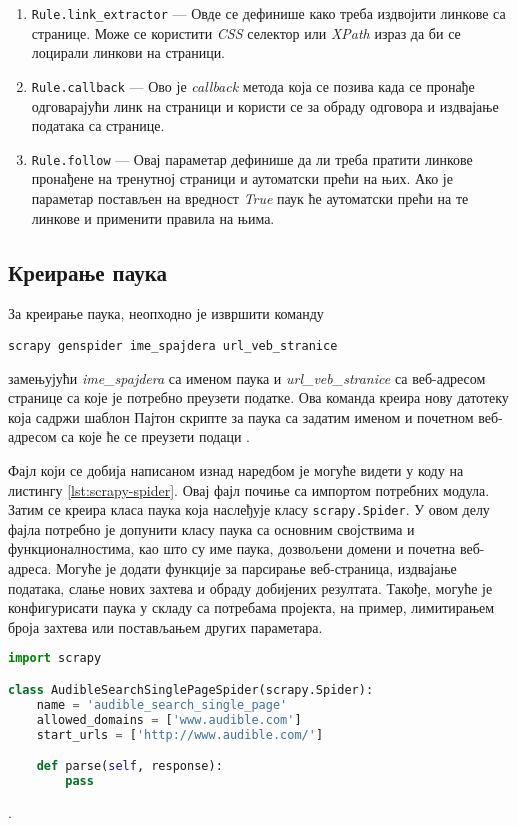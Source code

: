 \documentclass[12pt,oneside]{memoir}
\begin{document}
\begin{enumerate}
    \item \texttt{Rule.link\_extractor} --- Овде се дефинише како треба издвојити линкове са странице. Може се користити \textit{CSS} селектор или \textit{XPath} израз да би се лоцирали линкови на страници.
    \item \texttt{Rule.callback} --- Ово је \textit{callback} метода која се позива када се пронађе одговарајући линк на страници и користи се за обраду одговора и издвајање података са странице.
    \item \texttt{Rule.follow} --- Овај параметар дефинише да ли треба пратити линкове пронађене на тренутној страници и аутоматски прећи на њих. Ако је параметар постављен на вредност \textit{True} паук ће аутоматски прећи на те линкове и применити правила на њима.
\end{enumerate}

\subsection{Креирање паука}
За креирање паука, неопходно је извршити команду
\begin{verbatim}
scrapy genspider ime_spajdera url_veb_stranice
\end{verbatim}
замењујући \textit{ime\_spajdera} са именом паука и \textit{url\_veb\_stranice} са веб-адресом странице са које је потребно преузети податке. Ова команда креира нову датотеку која садржи шаблон Пајтон скрипте за паука са задатим именом и почетном веб-адресом са које ће се преузети подаци \cite{WebScrapingWithPython}.

Фајл који се добија написаном изнад наредбом је могуће видети у коду на листингу \ref{lst:scrapy-spider}. Овај фајл почиње са импортом потребних модула. Затим се креира класа паука која наслеђује класу \texttt{scrapy.Spider}. У овом делу фајла потребно је допунити класу паука са основним својствима и функционалностима, као што су име паука, дозвољени домени и почетна веб-адреса. Могуће је додати функције за парсирање веб-страница, издвајање података, слање нових захтева и обраду добијених резултата. Такође, могуће је конфигурисати паука у складу са потребама пројекта, на пример, лимитирањем броја захтева или постављањем других параметара. 

\begin{lstlisting}[language=Python, caption={Шаблон паука}, label={lst:scrapy-spider}]
import scrapy

class AudibleSearchSinglePageSpider(scrapy.Spider):
    name = 'audible_search_single_page'
    allowed_domains = ['www.audible.com']
    start_urls = ['http://www.audible.com/']

    def parse(self, response):
        pass
\end{lstlisting}.
\end{document}
